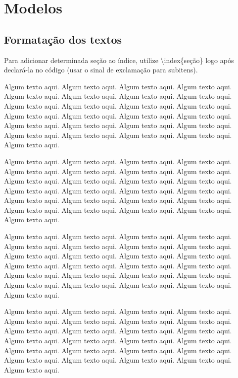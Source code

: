
\chapter{Modelos}

\section{Formatação dos textos}

Para adicionar determinada seção ao índice, utilize \textbackslash index\{seção\} logo após declará-la no código (usar o sinal de exclamação para subitens).

Algum texto aqui. Algum texto aqui. Algum texto aqui. Algum texto aqui. Algum texto aqui. Algum texto aqui. Algum texto aqui. Algum texto aqui. Algum texto aqui. Algum texto aqui. Algum texto aqui. Algum texto aqui. Algum texto aqui. Algum texto aqui. Algum texto aqui. Algum texto aqui. Algum texto aqui. Algum texto aqui. Algum texto aqui. Algum texto aqui. Algum texto aqui. Algum texto aqui. Algum texto aqui. Algum texto aqui. Algum texto aqui.

Algum texto aqui. Algum texto aqui. Algum texto aqui. Algum texto aqui. Algum texto aqui. Algum texto aqui. Algum texto aqui. Algum texto aqui. Algum texto aqui. Algum texto aqui. Algum texto aqui. Algum texto aqui. Algum texto aqui. Algum texto aqui. Algum texto aqui. Algum texto aqui. Algum texto aqui. Algum texto aqui. Algum texto aqui. Algum texto aqui. Algum texto aqui. Algum texto aqui. Algum texto aqui. Algum texto aqui. Algum texto aqui.

Algum texto aqui. Algum texto aqui. Algum texto aqui. Algum texto aqui. Algum texto aqui. Algum texto aqui. Algum texto aqui. Algum texto aqui. Algum texto aqui. Algum texto aqui. Algum texto aqui. Algum texto aqui. Algum texto aqui. Algum texto aqui. Algum texto aqui. Algum texto aqui. Algum texto aqui. Algum texto aqui. Algum texto aqui. Algum texto aqui. Algum texto aqui. Algum texto aqui. Algum texto aqui. Algum texto aqui. Algum texto aqui.

Algum texto aqui. Algum texto aqui. Algum texto aqui. Algum texto aqui. Algum texto aqui. Algum texto aqui. Algum texto aqui. Algum texto aqui. Algum texto aqui. Algum texto aqui. Algum texto aqui. Algum texto aqui. Algum texto aqui. Algum texto aqui. Algum texto aqui. Algum texto aqui. Algum texto aqui. Algum texto aqui. Algum texto aqui. Algum texto aqui. Algum texto aqui. Algum texto aqui. Algum texto aqui. Algum texto aqui. Algum texto aqui.

